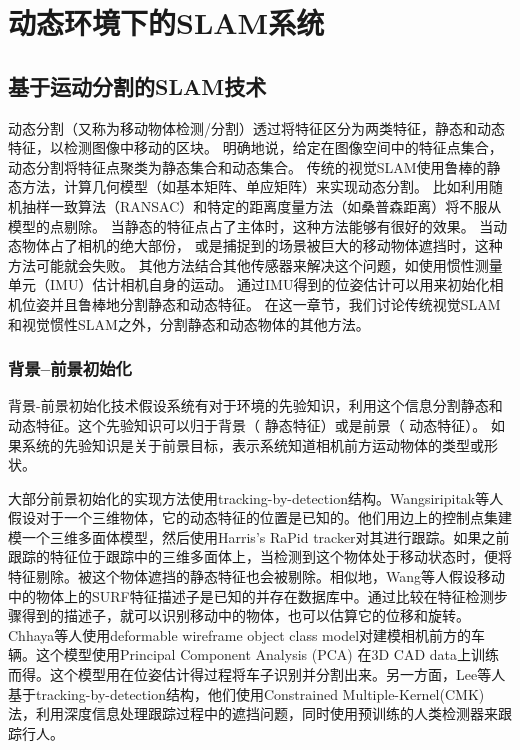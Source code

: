\section{动态环境下的SLAM系统}
\subsection{基于运动分割的SLAM技术}
\label{subsec:motion_segmentation}
动态分割（又称为移动物体检测/分割\cite{Derome2015Moving, Klappstein2008Moving, Kundu2009Moving}）透过将特征区分为两类特征，静态和动态特征，以检测图像中移动的区块。
明确地说，给定在图像空间中的特征点集合，动态分割将特征点聚类为静态集合和动态集合。
传统的视觉SLAM使用鲁棒的静态方法，计算几何模型（如基本矩阵、单应矩阵）来实现动态分割。
比如利用随机抽样一致算法（RANSAC）\cite{Fischler1981Random}和特定的距离度量方法（如桑普森距离\cite{Hartley2008Multiple}）将不服从模型的点剔除。
当静态的特征点占了主体时，这种方法能够有很好的效果。
当动态物体占了相机的绝大部份， 或是捕捉到的场景被巨大的移动物体遮挡时，这种方法可能就会失败。
其他方法结合其他传感器来解决这个问题，如使用惯性测量单元（IMU）估计相机自身的运动\cite{Jones2011Visual, Leutenegger2014Keyframe}。
通过IMU得到的位姿估计可以用来初始化相机位姿并且鲁棒地分割静态和动态特征。
在这一章节，我们讨论传统视觉SLAM和视觉惯性SLAM之外，分割静态和动态物体的其他方法。

\subsubsection{背景--前景初始化}
背景-前景初始化技术假设系统有对于环境的先验知识，利用这个信息分割静态和动态特征。这个先验知识可以归于背景（ 静态特征）或是前景（ 动态特征）。
如果系统的先验知识是关于前景目标，表示系统知道相机前方运动物体的类型或形状。

大部分前景初始化的实现方法使用tracking-by-detection结构\cite{Breitenstein2010Online, Lee2014Driving}。Wangsiripitak等人\cite{Wangsiripitak2009Avoiding}假设对于一个三维物体，它的动态特征的位置是已知的。他们用边上的控制点集建模一个三维多面体模型，然后使用Harris’s RaPid tracker\cite{Harris1990RAPID}对其进行跟踪。如果之前跟踪的特征位于跟踪中的三维多面体上，当检测到这个物体处于移动状态时，便将特征剔除。被这个物体遮挡的静态特征也会被剔除。相似地，Wang等人\cite{Wang2010Visual}假设移动中的物体上的SURF特征描述子\cite{Bay2008Speeded}是已知的并存在数据库中。通过比较在特征检测步骤得到的描述子，就可以识别移动中的物体，也可以估算它的位移和旋转。Chhaya等人\cite{Chhaya2016Monocular}使用deformable wireframe object class model对建模相机前方的车辆。这个模型使用Principal Component Analysis (PCA) 在3D CAD data上训练而得。这个模型用在位姿估计得过程将车子识别并分割出来。另一方面，Lee等人\cite{Lee2014Driving, Lee2016Ground}基于tracking-by-detection结构，他们使用Constrained Multiple-Kernel(CMK)法，利用深度信息处理跟踪过程中的遮挡问题，同时使用预训练的人类检测器来跟踪行人。

